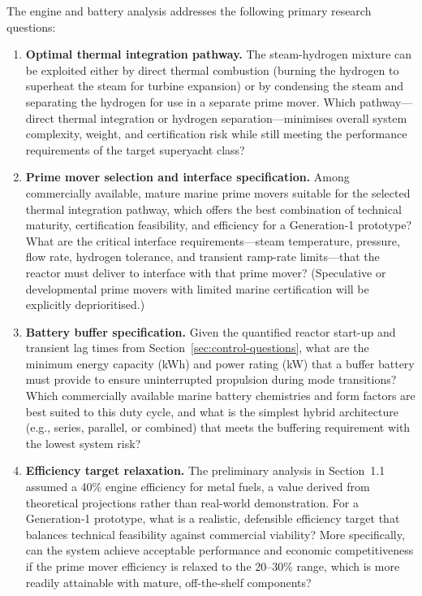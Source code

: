 \documentclass[12pt]{article}
\begin{document}
The engine and battery analysis addresses the following primary research questions:

\begin{enumerate}
    \item \textbf{Optimal thermal integration pathway.} The steam-hydrogen mixture can be exploited either by direct thermal combustion (burning the hydrogen to superheat the steam for turbine expansion) or by condensing the steam and separating the hydrogen for use in a separate prime mover. Which pathway---direct thermal integration or hydrogen separation---minimises overall system complexity, weight, and certification risk while still meeting the performance requirements of the target superyacht class?

    \item \textbf{Prime mover selection and interface specification.} Among commercially available, mature marine prime movers suitable for the selected thermal integration pathway, which offers the best combination of technical maturity, certification feasibility, and efficiency for a Generation‑1 prototype? What are the critical interface requirements---steam temperature, pressure, flow rate, hydrogen tolerance, and transient ramp-rate limits---that the reactor must deliver to interface with that prime mover? (Speculative or developmental prime movers with limited marine certification will be explicitly deprioritised.)

    \item \textbf{Battery buffer specification.} Given the quantified reactor start-up and transient lag times from Section~\ref{sec:control-questions}, what are the minimum energy capacity (kWh) and power rating (kW) that a buffer battery must provide to ensure uninterrupted propulsion during mode transitions? Which commercially available marine battery chemistries and form factors are best suited to this duty cycle, and what is the simplest hybrid architecture (e.g., series, parallel, or combined) that meets the buffering requirement with the lowest system risk?

    \item \textbf{Efficiency target relaxation.} The preliminary analysis in Section~1.1 assumed a 40\% engine efficiency for metal fuels, a value derived from theoretical projections rather than real-world demonstration. For a Generation‑1 prototype, what is a realistic, defensible efficiency target that balances technical feasibility against commercial viability? More specifically, can the system achieve acceptable performance and economic competitiveness if the prime mover efficiency is relaxed to the 20--30\% range, which is more readily attainable with mature, off-the-shelf components?
\end{enumerate}
\end{document}
